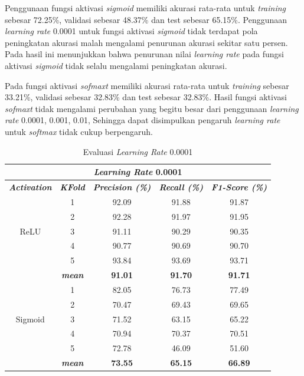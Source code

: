 \begin{table}[H]
    Penggunaan fungsi aktivasi \textit{sigmoid} memiliki akurasi rata-rata untuk \textit{training} sebesar 72.25\%, validasi sebesar 48.37\% dan test sebesar 65.15\%. Penggunaan \textit{learning rate} 0.0001 untuk fungsi aktivasi \textit{sigmoid} tidak terdapat pola peningkatan akurasi malah mengalami penurunan akurasi sekitar satu persen. Pada hasil ini menunjukkan bahwa penurunan nilai \textit{learning rate} pada fungsi aktivasi \textit{sigmoid}
    tidak selalu mengalami peningkatan akurasi. 

    Pada fungsi aktivasi \textit{sofmaxt} memiliki akurasi rata-rata untuk \textit{training} sebesar 33.21\%, validasi sebesar 32.83\% dan test sebesar 32.83\%. Hasil fungsi aktivasi \textit{sofmaxt} tidak mengalami perubahan yang begitu besar dari penggunaan \textit{learning rate} 0.0001, 0.001, 0.01, Sehingga dapat disimpulkan pengaruh \textit{learning rate} untuk \textit{softmax }tidak cukup berpengaruh.



    \begin{table}[H]
        \centering
        \caption{Evaluasi \textit{Learning Rate} 0.0001 }
        \begin{tabular}{ccccc}
            \toprule
            \multicolumn{5}{c}{\textit{Learning Rate} 0.0001} \\ \hline
            
            \textbf{\textit{Activation}} & \multicolumn{1}{c}{\textbf{\textit{KFold}}} & \textbf{\textit{Precision (\%)} } & \textbf{\textit{Recall (\%)}} & \textbf{\textit{F1-Score (\%)}}  \\
    
            \midrule
            \multirow{5}{*}{ReLU} 
            
            & 1 & 92.09 & 91.88 & 91.87 \\
            & 2 & 92.28 & 91.97 & 91.95 \\
            & 3 & 91.11 & 90.29 & 90.35 \\
            & 4 & 90.77 & 90.69 & 90.70 \\
            & 5 & 93.84 & 93.69 & 93.71 \\ 
            & \textit{\textbf{mean}}& \textbf{91.01} & \textbf{91.70} &\textbf{91.71} \\ 
            \hline


            
            \multirow{5}{*}{Sigmoid}
            & 1 &  82.05 & 76.73 & 77.49  \\
            & 2 &  70.47 & 69.43 & 69.65 \\
            & 3 &  71.52 & 63.15 & 65.22  \\
            & 4 &  70.94 & 70.37 & 70.51 \\
            & 5 &  72.78 & 46.09 & 51.60 \\
            & \textit{\textbf{mean}}& \textbf{73.55} & \textbf{65.15} &\textbf{66.89} \\ 
                        \hline
    

\end{tabular}
\end{table}
\end{table}
